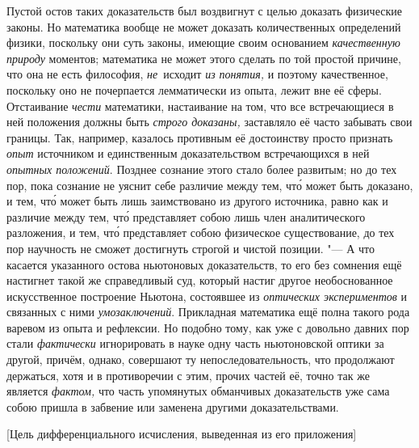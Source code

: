 Пустой остов таких доказательств был воздвигнут с целью доказать физические
законы. Но математика вообще не может доказать количественных определений
физики, поскольку они суть законы, имеющие своим основанием {\em качественную
природу} моментов; математика не может этого сделать по той простой причине,
что она не есть философия, {\em не}~исходит {\em из понятия,} и поэтому
качественное, поскольку оно не почерпается лемматически из опыта, лежит вне её
сферы. Отстаивание {\em чести} математики, настаивание на том, что все
встречающиеся в ней положения должны быть {\em строго доказаны,} заставляло её
часто забывать свои границы. Так, например, казалось противным её достоинству
просто признать {\em опыт} источником и единственным доказательством
встречающихся в ней {\em опытных положений}. Позднее сознание этого
стало более развитым; но до тех пор, пока сознание не уяснит
себе различие между тем, чт\'{о} может быть доказано, и тем, чт\'{о} может быть лишь
заимствовано из другого источника, равно как и различие между тем, чт\'{о}
представляет собою лишь член аналитического разложения, и тем, чт\'{о} представляет
собою физическое существование, до тех пор научность не сможет достигнуть
строгой и чистой позиции. "--- А что касается указанного остова ньютоновых
доказательств, то его без сомнения ещё настигнет такой же справедливый суд,
который настиг другое необоснованное искусственное построение Ньютона,
состоявшее из {\em оптических экспериментов} и связанных с ними
{\em умозаключений}. Прикладная математика ещё полна такого рода варевом из
опыта и рефлексии. Но подобно тому, как уже с довольно давних пор стали
{\em фактически} игнорировать в науке одну часть ньютоновской оптики за другой,
причём, однако, совершают ту непоследовательность, что продолжают держаться,
хотя и в противоречии с этим, прочих частей её, точно так же является
{\em фактом,} что часть упомянутых обманчивых доказательств уже сама собою
пришла в забвение или заменена другими доказательствами.

%
{[Цель дифференциального исчисления, выведенная из его приложения]}

